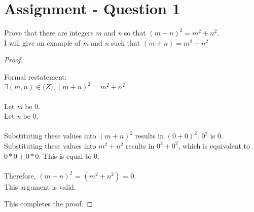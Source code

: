 \documentclass{article}
\begin{document}
\section{Assignment - Question 1}
Prove that there are integers \textit{m} and \textit{n} so that $(m+n)^2=m^2 + n^2$.\\
I will give an example of \textit{m} and \textit{n} such that $(m+n) = m^2 + n^2$ \\
\begin{proof}
  \begin{addmargin}{1em}
    Formal restatement:\\
    $\exists (m, n) \in \mathbb(Z) , (m+n)^2 = m^2 + n^2$\\\\
    Let \textit{m} be 0.\\
    Let \textit{n} be 0. \\\\
    Substituting these values into $(m+n)^2$ results in $(0 + 0)^2$. $0^2$ is 0.\\
    Substituting these values into $m^2 + n^2$ results in $0^2 + 0^2$, which is equivalent to $0*0 + 0*0$. This is equal to 0.\\\\
    Therefore, $(m+n)^2$ = $(m^2+n^2)$ = 0.\\
    This argument is valid.\\
  \end{addmargin}

  This completes the proof.

\end{proof}
\end{document}

